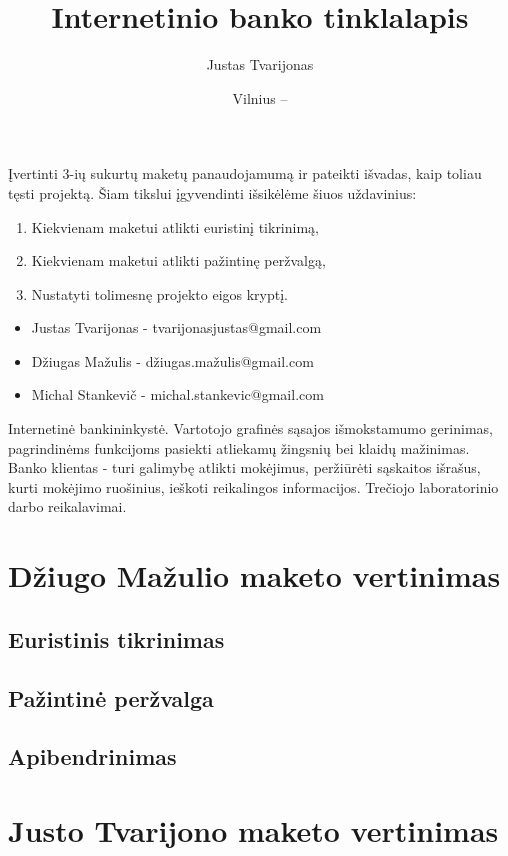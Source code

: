 \documentclass{VUMIFPSkursinis}
\title{Internetinio banko tinklalapis}
\author{Justas Tvarijonas}
\date{Vilnius – \the\year}
\begin{document}
\maketitle
{}
Įvertinti 3-ių sukurtų maketų panaudojamumą ir pateikti išvadas, kaip toliau tęsti projektą. Šiam tikslui įgyvendinti išsikėlėme šiuos uždavinius:
\begin{enumerate}
	\item Kiekvienam maketui atlikti euristinį tikrinimą,
	\item Kiekvienam maketui atlikti pažintinę peržvalgą,
	\item Nustatyti tolimesnę projekto eigos kryptį.
\end{enumerate}
\begin{itemize}
	\item Justas Tvarijonas - tvarijonasjustas@gmail.com
	\item Džiugas Mažulis - džiugas.mažulis@gmail.com
	\item Michal Stankevič - michal.stankevic@gmail.com 
\end{itemize}
\tableofcontents
{}
Internetinė bankininkystė.
Vartotojo grafinės sąsajos išmokstamumo gerinimas, pagrindinėms funkcijoms pasiekti atliekamų žingsnių bei klaidų mažinimas.
Banko klientas - turi galimybę atlikti mokėjimus, peržiūrėti sąskaitos išrašus, kurti mokėjimo ruošinius, ieškoti reikalingos informacijos.
Trečiojo laboratorinio darbo reikalavimai.
\section{Džiugo Mažulio maketo vertinimas}
\subsection{Euristinis tikrinimas}
\subsection{Pažintinė peržvalga}
\subsection{Apibendrinimas}
\section{Justo Tvarijono maketo vertinimas}
\end{document}
